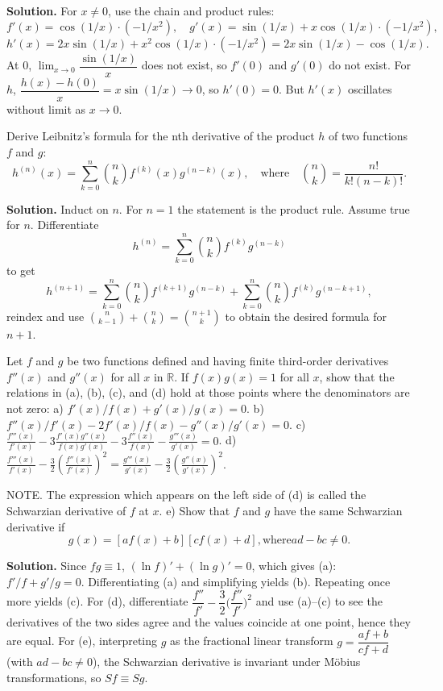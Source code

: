 \noindent\textbf{Solution.}
For $x\ne 0$, use the chain and product rules:
\[f'(x)=\cos(1/x)\cdot(-1/x^2),\quad g'(x)=\sin(1/x)+x\cos(1/x)\cdot(-1/x^2),\]
\[h'(x)=2x\sin(1/x)+x^2\cos(1/x)\cdot(-1/x^2)=2x\sin(1/x)-\cos(1/x).\]
At $0$, $\lim_{x\to 0}\dfrac{\sin(1/x)}{x}$ does not exist, so $f'(0)$ and $g'(0)$ do not exist. For $h$, $\dfrac{h(x)-h(0)}{x}=x\sin(1/x)\to 0$, so $h'(0)=0$. But $h'(x)$ oscillates without limit as $x\to 0$.

\begin{problembox}
Derive Leibnitz's formula for the nth derivative of the product \( h \) of two functions \( f \) and \( g \):
\[ h^{(n)}(x) = \sum_{k=0}^{n} \binom{n}{k} f^{(k)}(x)g^{(n-k)}(x), \quad \text{where} \quad \binom{n}{k} = \frac{n!}{k!(n-k)!}. \]
\end{problembox}

\noindent\textbf{Solution.}
Induct on $n$. For $n=1$ the statement is the product rule. Assume true for $n$. Differentiate
\[h^{(n)}=\sum_{k=0}^n\binom{n}{k}f^{(k)}g^{(n-k)}\]
to get
\[h^{(n+1)}=\sum_{k=0}^n\binom{n}{k}f^{(k+1)}g^{(n-k)}+\sum_{k=0}^n\binom{n}{k}f^{(k)}g^{(n-k+1)},\]
reindex and use $\binom{n}{k-1}+\binom{n}{k}=\binom{n+1}{k}$ to obtain the desired formula for $n+1$.

\begin{problembox}
Let \( f \) and \( g \) be two functions defined and having finite third-order derivatives \( f''(x) \) and \( g''(x) \) for all \( x \) in \( \mathbb{R} \). If \( f(x)g(x) = 1 \) for all \( x \), show that the relations in (a), (b), (c), and (d) hold at those points where the denominators are not zero:
a) \( f'(x)/f(x) + g'(x)/g(x) = 0 \).
b) \( f''(x)/f'(x) - 2f'(x)/f(x) - g''(x)/g'(x) = 0 \).
c) \( \frac{f'''(x)}{f'(x)} - 3\frac{f'(x)g''(x)}{f(x)g'(x)} - 3\frac{f''(x)}{f(x)} - \frac{g'''(x)}{g'(x)} = 0 \).
d) \( \frac{f'''(x)}{f'(x)} - \frac{3}{2}\left(\frac{f''(x)}{f'(x)}\right)^2 = \frac{g'''(x)}{g'(x)} - \frac{3}{2}\left(\frac{g''(x)}{g'(x)}\right)^2 \).

NOTE. The expression which appears on the left side of (d) is called the Schwarzian derivative of \( f \) at \( x \).
e) Show that \( f \) and \( g \) have the same Schwarzian derivative if
\[ g(x) = [af(x) + b][cf(x) + d], \text{where} ad - bc \neq 0. \]
\end{problembox}

\noindent\textbf{Solution.}
Since $fg\equiv 1$, $(\ln f)'+(\ln g)'=0$, which gives (a): $f'/f+g'/g=0$. Differentiating (a) and simplifying yields (b). Repeating once more yields (c). For (d), differentiate $\dfrac{f''}{f'}-\dfrac{3}{2}\Big(\dfrac{f''}{f'}\Big)^{\!2}$ and use (a)–(c) to see the derivatives of the two sides agree and the values coincide at one point, hence they are equal. For (e), interpreting $g$ as the fractional linear transform $g=\dfrac{af+b}{cf+d}$ (with $ad-bc\ne 0$), the Schwarzian derivative is invariant under Möbius transformations, so $Sf\equiv Sg$.

